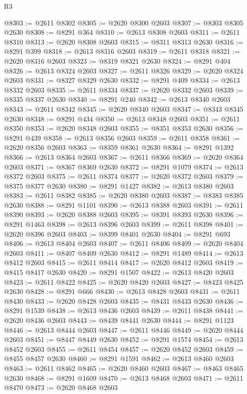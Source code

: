 \begin{lexlean}{R3}
\begin{coremodule}
@8303 := @2611 @8302
@8305 := @2620 @8300 @2603
@8307 := @8303 @8305 @2630
@8308 := @8291 @364
@8310 := @2613 @8308 @2603
@8311 := @2611 @8310
@8313 := @2620 @8308 @2603
@8315 := @8311 @8313 @2630
@8316 := @8291 @399
@8318 := @2613 @8316 @2603
@8319 := @2611 @8318
@8321 := @2620 @8316 @2603
@8323 := @8319 @8321 @2630
@8324 := @8291 @404
@8326 := @2613 @8324 @2603
@8327 := @2611 @8326
@8329 := @2620 @8324 @2603
@8331 := @8327 @8329 @2630
@8332 := @8291 @409
@8334 := @2613 @8332 @2603
@8335 := @2611 @8334
@8337 := @2620 @8332 @2603
@8339 := @8335 @8337 @2630
@8340 := @8291 @240
@8342 := @2613 @8340 @2603
@8343 := @2611 @8342
@8345 := @2620 @8340 @2603
@8347 := @8343 @8345 @2630
@8348 := @8291 @434
@8350 := @2613 @8348 @2603
@8351 := @2611 @8350
@8353 := @2620 @8348 @2603
@8355 := @8351 @8353 @2630
@8356 := @8291 @439
@8358 := @2613 @8356 @2603
@8359 := @2611 @8358
@8361 := @2620 @8356 @2603
@8363 := @8359 @8361 @2630
@8364 := @8291 @1392
@8366 := @2613 @8364 @2603
@8367 := @2611 @8366
@8369 := @2620 @8364 @2603
@8371 := @8367 @8369 @2630
@8372 := @8291 @1079
@8374 := @2613 @8372 @2603
@8375 := @2611 @8374
@8377 := @2620 @8372 @2603
@8379 := @8375 @8377 @2630
@8380 := @8291 @1427
@8382 := @2613 @8380 @2603
@8383 := @2611 @8382
@8385 := @2620 @8380 @2603
@8387 := @8383 @8385 @2630
@8388 := @8291 @1101
@8390 := @2613 @8388 @2603
@8391 := @2611 @8390
@8393 := @2620 @8388 @2603
@8395 := @8391 @8393 @2630
@8396 := @8291 @1463
@8398 := @2613 @8396 @2603
@8399 := @2611 @8398
@8401 := @2620 @8396 @2603
@8403 := @8399 @8401 @2630
@8404 := @8291 @693
@8406 := @2613 @8404 @2603
@8407 := @2611 @8406
@8409 := @2620 @8404 @2603
@8411 := @8407 @8409 @2630
@8412 := @8291 @1489
@8414 := @2613 @8412 @2603
@8415 := @2611 @8414
@8417 := @2620 @8412 @2603
@8419 := @8415 @8417 @2630
@8420 := @8291 @1507
@8422 := @2613 @8420 @2603
@8423 := @2611 @8422
@8425 := @2620 @8420 @2603
@8427 := @8423 @8425 @2630
@8428 := @8291 @666
@8430 := @2613 @8428 @2603
@8431 := @2611 @8430
@8433 := @2620 @8428 @2603
@8435 := @8431 @8433 @2630
@8436 := @8291 @1539
@8438 := @2613 @8436 @2603
@8439 := @2611 @8438
@8441 := @2620 @8436 @2603
@8443 := @8439 @8441 @2630
@8444 := @8291 @1123
@8446 := @2613 @8444 @2603
@8447 := @2611 @8446
@8449 := @2620 @8444 @2603
@8451 := @8447 @8449 @2630
@8452 := @8291 @1574
@8454 := @2613 @8452 @2603
@8455 := @2611 @8454
@8457 := @2620 @8452 @2603
@8459 := @8455 @8457 @2630
@8460 := @8291 @1591
@8462 := @2613 @8460 @2603
@8463 := @2611 @8462
@8465 := @2620 @8460 @2603
@8467 := @8463 @8465 @2630
@8468 := @8291 @1609
@8470 := @2613 @8468 @2603
@8471 := @2611 @8470
@8473 := @2620 @8468 @2603

\end{coremodule}
\end{lexlean}
